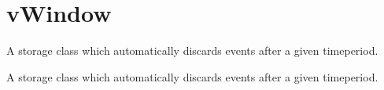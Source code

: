 \hypertarget{group__vWindow}{\section{v\-Window}
\label{group__vWindow}
}


A storage class which automatically discards events after a given timeperiod.  


A storage class which automatically discards events after a given timeperiod. 